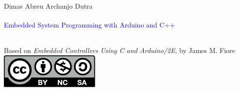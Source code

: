 \begin{titlingpage}
  \begingroup
  \raggedleft
  \vspace*{\baselineskip}
  {\Large Dimas Abreu Archanjo Dutra}\\[0.167\textheight]
  {\bfseries ~}\\[\baselineskip]
  {\textcolor{Blue}{\Huge Embedded System Programming with Arduino and C++}}\\[\baselineskip]
  {\small ~}\par
  \vfill
  {Based on \emph{Embedded Controllers Using C and Arduino/2E}, by James M. Fiore
    \\ \includegraphics{img/cc-by-nc-sa.pdf}}\par
  \vspace*{3\baselineskip}
  \endgroup
\end{titlingpage}

